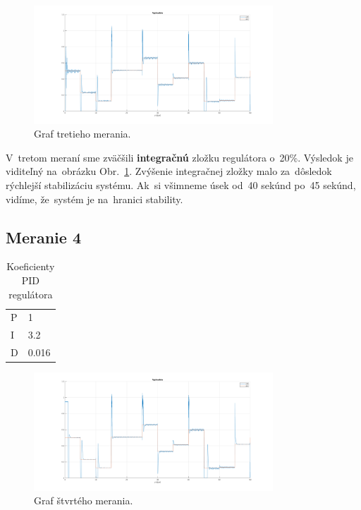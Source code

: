 \documentclass{article}
\begin{document}
\begin{figure}[!htbp]
	\begin{center}
		\includegraphics[width=0.8\textwidth]{./include/m4.png}
	\end{center}
	\caption{Graf tretieho merania.}
	\label{fig:meranie3}
\end{figure}

V~tretom meraní sme zväčšili \textbf{integračnú} zložku regulátora o~20\%. Výsledok je viditeľný
na~obrázku Obr.~\ref{fig:meranie3}. Zvýšenie integračnej zložky malo za~dôsledok rýchlejší stabilizáciu
systému. Ak~si všimneme úsek od~40 sekúnd po~45 sekúnd, vidíme, že~systém je na~hranici stability.

\clearpage

\subsection{Meranie 4}
\label{sec:meranie4}

\begin{table}[!htbp]
	\caption{Koeficienty PID regulátora}
	\label{tab:t4}
	\begin{center}
		\begin{tabular}[c]{|l|l|}
			\hline
			P & 1 \\
			I & 3.2 \\
			D & 0.016 \\
			\hline
		\end{tabular}
	\end{center}
\end{table}

\begin{figure}[!htbp]
	\begin{center}
		\includegraphics[width=0.8\textwidth]{./include/m6.png}
	\end{center}
	\caption{Graf štvrtého merania.}
	\label{fig:meranie4}
\end{figure}
\end{document}
